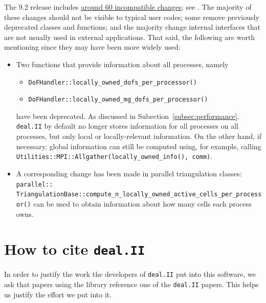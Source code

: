 \documentclass{ansarticle-preprint}
\newcommand{\specialword}[1]{\texttt{#1}}
\newcommand{\dealii}{{\specialword{deal.II}}\xspace}
\begin{document}
The 9.2 release includes
\href{https://dealii.org/developer/doxygen/deal.II/changes_between_9_1_1_and_9_2_0.html}
{around 60 incompatible changes}; see \cite{changes92}. The majority of these changes
should not be visible to typical user codes; some remove previously
deprecated classes and functions; and the majority change internal
interfaces that are not usually used in external
applications. That said, the following are worth mentioning since they
may have been more widely used:
\begin{itemize}
  \item Two functions that provide information about all processes,
        namely
        \begin{itemize}
          \item \texttt{DoFHandler::locally\_owned\_dofs\_per\_processor()}
          \item \texttt{DoFHandler::locally\_owned\_mg\_dofs\_per\_processor()}
        \end{itemize}
        have been deprecated. As discussed in
        Subection~\ref{subsec:performance}, \dealii{} by default no longer
        stores information for all processes on all processes, but only
        local or locally-relevant information. On the other
        hand, if necessary, global information can still be computed using,
        for example, calling
        \texttt{Utilities::MPI::Allgather(locally\_owned\_info(), comm)}.

  \item A corresponding change has been made in parallel triangulation
        classes:
        \texttt{parallel::} \texttt{TriangulationBase::compute\_n\_locally\_owned\_active\_cells\_per\_processor()}
        can be used to obtain information about how many cells each
        process owns.
\end{itemize}



\section{How to cite \dealii}\label{sec:cite}

In order to justify the work the developers of \dealii{} put into this
software, we ask that papers using the library reference one of the
\dealii{} papers. This helps us justify the effort we put into it.
\end{document}
